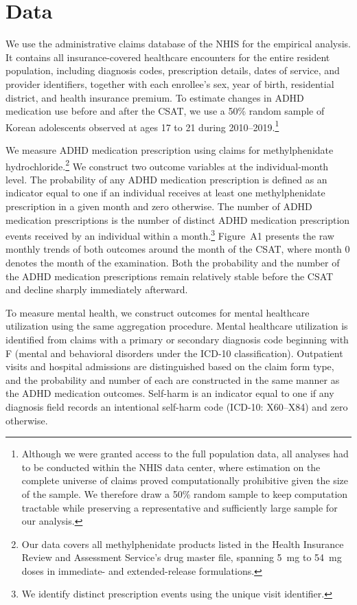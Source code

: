 \documentclass[12pt]{article}
\begin{document}
\section{Data}

We use the administrative claims database of the NHIS for the empirical analysis. It contains all insurance-covered healthcare encounters for the entire resident population, including diagnosis codes, prescription details, dates of service, and provider identifiers, together with each enrollee's sex, year of birth, residential district, and health insurance premium. To estimate changes in ADHD medication use before and after the CSAT, we use a 50\% random sample of Korean adolescents observed at ages 17 to 21 during 2010--2019.\footnote{Although we were granted access to the full population data, all analyses had to be conducted within the NHIS data center, where estimation on the complete universe of claims proved computationally prohibitive given the size of the sample. We therefore draw a 50\% random sample to keep computation tractable while preserving a representative and sufficiently large sample for our analysis.}

We measure ADHD medication prescription using claims for methylphenidate hydrochloride.\footnote{Our data covers all methylphenidate products listed in the Health Insurance Review and Assessment Service's drug master file, spanning 5~mg to 54~mg doses in immediate- and extended-release formulations.} We construct two outcome variables at the individual-month level. The probability of any ADHD medication prescription is defined as an indicator equal to one if an individual receives at least one methylphenidate prescription in a given month and zero otherwise. The number of ADHD medication prescriptions is the number of distinct ADHD medication prescription events received by an individual within a month.\footnote{We identify distinct prescription events using the unique visit identifier.} Figure~A1 presents the raw monthly trends of both outcomes around the month of the CSAT, where month 0 denotes the month of the examination. Both the probability and the number of the ADHD medication prescriptions remain relatively stable before the CSAT and decline sharply immediately afterward.

To measure mental health, we construct outcomes for mental healthcare utilization using the same aggregation procedure. Mental healthcare utilization is identified from claims with a primary or secondary diagnosis code beginning with F (mental and behavioral disorders under the ICD-10 classification). Outpatient visits and hospital admissions are distinguished based on the claim form type, and the probability and number of each are constructed in the same manner as the ADHD medication outcomes. Self-harm is an indicator equal to one if any diagnosis field records an intentional self-harm code (ICD-10: X60--X84) and zero otherwise.
\end{document}
